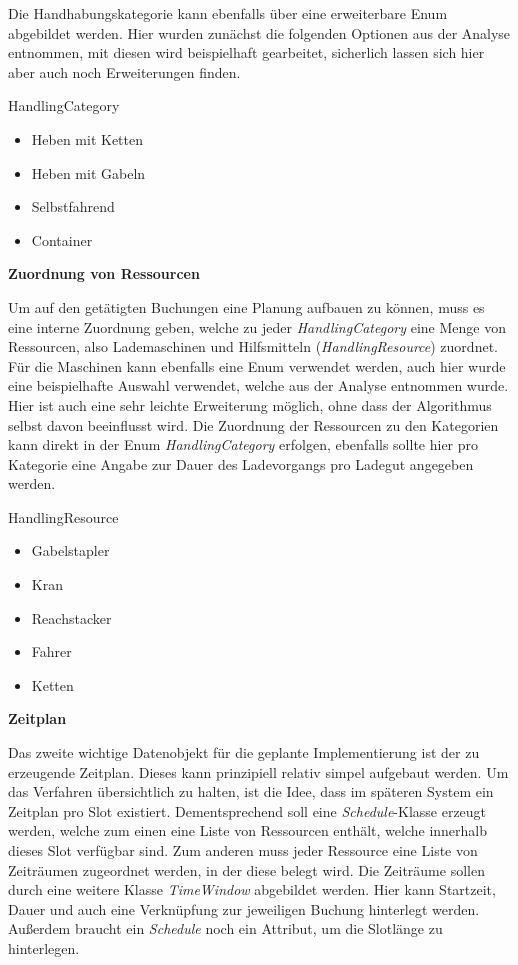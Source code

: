 Die Handhabungskategorie kann ebenfalls über eine erweiterbare Enum abgebildet werden. Hier wurden zunächst die folgenden Optionen aus der Analyse entnommen, mit diesen wird beispielhaft gearbeitet, sicherlich lassen sich hier aber auch noch Erweiterungen finden. 

HandlingCategory
\begin{itemize}
    \item Heben mit Ketten
    \item Heben mit Gabeln
    \item Selbstfahrend
    \item Container
\end{itemize}

\textbf{Zuordnung von Ressourcen}

Um auf den getätigten Buchungen eine Planung aufbauen zu können, muss es eine interne Zuordnung geben, welche zu jeder \textit{HandlingCategory} eine Menge von 
Ressourcen, also Lademaschinen und Hilfsmitteln (\textit{HandlingResource}) zuordnet. Für die Maschinen kann ebenfalls eine Enum verwendet werden, auch hier wurde eine beispielhafte Auswahl verwendet, welche aus der Analyse entnommen wurde. Hier ist auch eine sehr leichte Erweiterung möglich, ohne dass der Algorithmus selbst davon beeinflusst wird. Die Zuordnung der Ressourcen zu den Kategorien kann direkt in der Enum \textit{HandlingCategory} erfolgen, ebenfalls sollte hier pro Kategorie eine Angabe zur Dauer des Ladevorgangs pro Ladegut angegeben werden.

HandlingResource
\begin{itemize}
    \item Gabelstapler
    \item Kran
    \item Reachstacker
    \item Fahrer
    \item Ketten
\end{itemize}


\textbf{Zeitplan}

Das zweite wichtige Datenobjekt für die geplante Implementierung ist der zu erzeugende Zeitplan. Dieses kann prinzipiell relativ simpel aufgebaut werden. Um das Verfahren übersichtlich zu halten, ist die Idee, dass im späteren System ein Zeitplan pro Slot existiert. Dementsprechend soll eine \textit{Schedule}-Klasse erzeugt werden, welche zum einen eine Liste von Ressourcen enthält, welche innerhalb dieses Slot verfügbar sind. Zum anderen muss jeder Ressource eine Liste von Zeiträumen zugeordnet werden, in der diese belegt wird. Die Zeiträume sollen durch eine weitere Klasse \textit{TimeWindow} abgebildet werden. Hier kann Startzeit, Dauer und auch eine Verknüpfung zur jeweiligen Buchung hinterlegt werden. Außerdem braucht ein \textit{Schedule} noch ein Attribut, um die Slotlänge zu hinterlegen.


